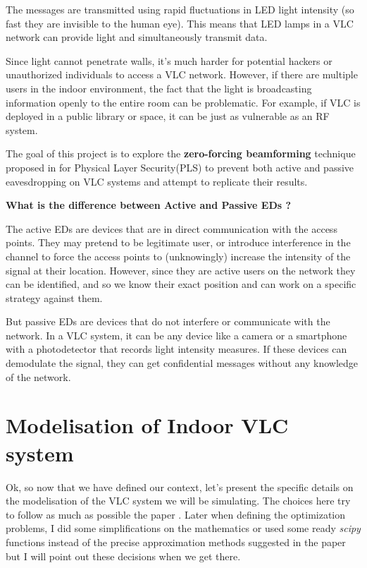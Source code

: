 \documentclass[a4paper,12pt,twoside]{article}
\begin{document}
	The messages are transmitted using rapid fluctuations in LED light intensity (so fast they are invisible to the human eye). This means that LED lamps in a VLC network can provide light and simultaneously transmit data.
	
	Since light cannot penetrate walls, it's much harder for potential hackers or unauthorized individuals to access a VLC network. However, if there are multiple users in the indoor environment, the fact that the light is broadcasting information openly to the entire room can be problematic. For example, if VLC is deployed in a public library or space, it can be just as vulnerable as an RF system.
	
	The goal of this project is to explore the \textbf{zero-forcing beamforming} technique proposed in \cite{Oxford2021} for Physical Layer Security(PLS) to prevent both active and passive eavesdropping on VLC systems and attempt to replicate their results.
	
	\begin{tcolorbox}
		\textbf{What is the difference between Active and Passive EDs ?}
		
		The active EDs are devices that are in direct communication with the access points. They may pretend to be legitimate user, or introduce interference in the channel to force the access points to (unknowingly) increase the intensity of the signal at their location. However, since they are active users on the network they can be identified, and so we know their exact position and can work on a specific strategy against them.
		
		But passive EDs are devices that do not interfere or communicate with the network. In a VLC system, it can be any device like a camera or a smartphone with a photodetector that records light intensity measures. If these devices can demodulate the signal, they can get confidential messages without any knowledge of the network.
		
	\end{tcolorbox}
	
	\section{Modelisation of Indoor VLC system}
	
	Ok, so now that we have defined our context, let's present the specific details on the modelisation of the VLC system we will be simulating. The choices here try to follow as much as possible the paper \cite{Oxford2021}. Later when defining the optimization problems, I did some simplifications on the mathematics or used some ready \textit{scipy} functions instead of the precise approximation methods suggested in the paper but I will point out these decisions when we get there.
	
\end{document}
